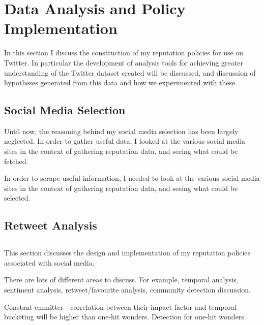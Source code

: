 \chapter{Data Analysis and Policy Implementation}\label{C:us}

In this section I discuss the construction of my reputation policies for use on Twitter. In particular the development of analysis tools for achieving greater understanding of the Twitter dataset created will be discussed, and discussion of hypotheses generated from this data and how we experimented with these. %

\section{Social Media Selection}

Until now, the reasoning behind my social media selection has been largely neglected. In order to gather useful data, I looked at the various social media sites in the context of gathering reputation data, and seeing what could be fetched. %

In order to scrape useful information, I needed to look at the various social media sites in the context of gathering reputation data, and seeing what could be selected. 

\section{Retweet Analysis}


\section{}

This section discusses the design and implementation of my reputation policies associated with social media. 

There are lots of different areas to discuss. For example, temporal analysis, sentiment analysis, retweet/favourite analysis, community detection discussion. 

Constant emmitter - correlation between their impact factor and temporal bucketing will be higher than one-hit wonders. Detection for one-hit wonders. 





